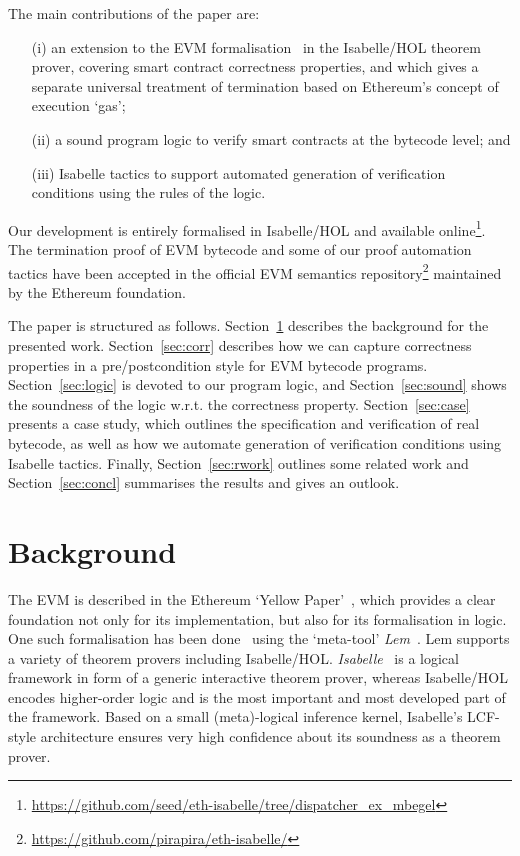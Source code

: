\documentclass[sigplan,10pt,review]{acmart}\settopmatter{printfolios=true,printccs=false,printacmref=false}
\begin{document}
The main contributions of the paper are:
\begin{itemize}
\item[(i)] an extension to the EVM formalisation~\cite{Yoichi} in the Isabelle/HOL theorem prover,
           covering smart contract correctness properties, and which gives a separate universal
           treatment of termination based on Ethereum's concept of execution `gas';
\item[(ii)] a sound program logic to verify smart contracts at the bytecode level; and
\item[(iii)] Isabelle tactics to support automated generation of verification
            conditions using the rules of the logic.
\end{itemize}

Our development is entirely formalised in Isabelle/HOL and available online\footnote{\url{https://github.com/seed/eth-isabelle/tree/dispatcher_ex_mbegel}}.
The termination proof of EVM bytecode and some of our proof
automation tactics have been accepted in the official EVM
semantics repository\footnote{\url{https://github.com/pirapira/eth-isabelle/}} maintained by the Ethereum foundation.

The paper is structured as follows. Section~\ref{sec:bg} describes the background
for the presented work. Section~\ref{sec:corr} describes how we can capture correctness properties in a pre/postcondition
style for EVM bytecode programs. Section~\ref{sec:logic} is devoted to our program logic, 
and Section~\ref{sec:sound} shows the soundness of the logic
w.r.t. the correctness property.
Section~\ref{sec:case} presents a case study, which outlines the
specification and verification of real bytecode, as well as how
we automate generation of verification conditions using Isabelle tactics.
Finally, Section~\ref{sec:rwork} outlines some related work and
Section~\ref{sec:concl} summarises the results and gives an outlook.
%
\section{Background} 
\label{sec:bg}
The EVM is described in the Ethereum `Yellow Paper'~\cite{wood2014ethereum},
which provides a clear foundation not only for its implementation, but also for its formalisation in logic.
One such formalisation has been done~\cite{Yoichi} using the `meta-tool' \emph{Lem}~\cite{DBLP:conf/icfp/MulliganOGRS14}.
Lem supports a variety of theorem provers including Isabelle/HOL.
\emph{Isabelle}~\cite{Nipkow_PW:Isabelle} is a logical framework in form of a generic interactive theorem prover, whereas
Isabelle/HOL encodes higher-order logic and is the most important and most developed part of the framework.
Based on a small (meta)-logical inference kernel, Isabelle's LCF-style architecture
ensures very high confidence about its soundness as a theorem prover.
 
\end{document}
